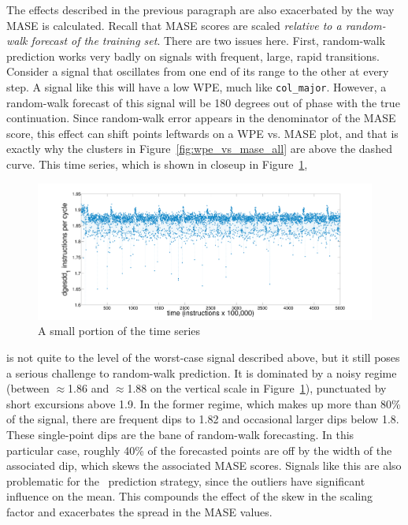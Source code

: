 The effects described in the previous paragraph are also exacerbated
by the way MASE is calculated.  Recall that MASE scores are scaled
\emph{relative to a random-walk forecast of the training set}.  There
are two issues here.  First, random-walk prediction works very badly
on signals with frequent, large, rapid transitions.  Consider a signal
that oscillates from one end of its range to the other at every step.
A signal like this will have a low WPE, much like {\tt col\_major}.
However, a random-walk forecast of this signal will be 180 degrees out
of phase with the true continuation.  Since random-walk error appears
in the denominator of the MASE score, this effect can shift points
leftwards on a WPE vs. MASE plot, and that is exactly why the \svdone
clusters in Figure~\ref{fig:wpe_vs_mase_all} are above the dashed
curve.  This time series, which is shown in closeup in
Figure~\ref{fig:svdone-ts},
\begin{figure}[htbp]
  \centering
    \includegraphics[width=\columnwidth]{figs/svdonets2}
\caption{A small portion of the \svdone time series}\label{fig:svdone-ts}
\end{figure}
is not quite to the level of the worst-case signal described above,
but it still poses a serious challenge to random-walk prediction.  It
is dominated by a noisy regime (between $\approx$1.86 and
$\approx$1.88 on the vertical scale in Figure~\ref{fig:svdone-ts}),
punctuated by short excursions above 1.9.  In the former regime, which
makes up more than 80\% of the signal, there are frequent dips to 1.82
and occasional larger dips below 1.8.  These single-point dips are the
bane of random-walk forecasting.  In this particular case, roughly
40\% of the forecasted points are off by the width of the associated
dip, which skews the associated MASE scores.  Signals like this are
also problematic for the \naive ~prediction strategy, since the
outliers have significant influence on the mean.  This compounds the
effect of the skew in the scaling factor and exacerbates the spread in
the \svdone MASE values.

